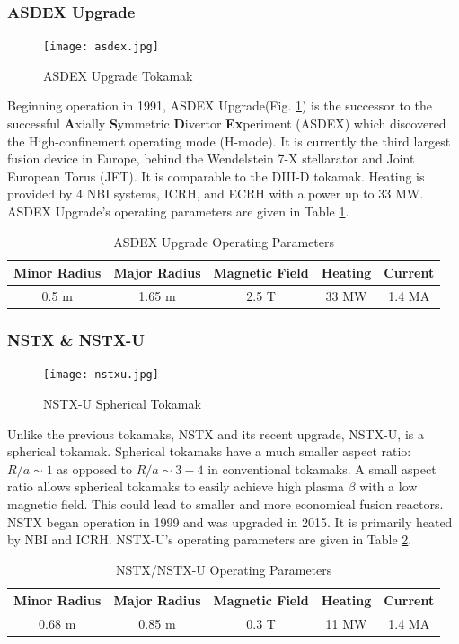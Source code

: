 \subsubsection{ASDEX Upgrade}
\begin{figure}[ht]
    \centering
    \texttt{[image: asdex.jpg]}
    \caption{ASDEX Upgrade Tokamak\cite{geiger2013thesis}}
    \label{fig:augd}
\end{figure}
Beginning operation in 1991, ASDEX Upgrade(Fig. \ref{fig:augd}) is the successor to the successful \textbf{A}xially \textbf{S}ymmetric \textbf{D}ivertor \textbf{Ex}periment (ASDEX) which discovered the High-confinement operating mode (H-mode)\cite{wagner1982hmode}. It is currently the third largest fusion device in Europe, behind the Wendelstein 7-X stellarator\cite{wendelstein7x1993} and Joint European Torus (JET)\cite{jet1985}. It is comparable to the DIII-D tokamak. Heating is provided by 4 NBI systems, ICRH, and ECRH with a power up to 33 MW. ASDEX Upgrade's operating parameters are given in Table \ref{tab:augd}. 
\begin{table}[]
    \centering
    \caption{ASDEX Upgrade Operating Parameters}
    \label{tab:augd}
    \begin{tabular}{ccccc}
        \textbf{Minor Radius} & \textbf{Major Radius} & \textbf{Magnetic Field} & \textbf{Heating} & \textbf{Current} \\ \hline \hline
        0.5 m & 1.65 m & 2.5 T & 33 MW & 1.4 MA \\ \hline
    \end{tabular}
\end{table}

\subsubsection{NSTX \& NSTX-U}
\begin{figure}[ht]
    \centering
    \texttt{[image: nstxu.jpg]}
    \caption{NSTX-U Spherical Tokamak}
    \label{fig:nstx}
\end{figure}
Unlike the previous tokamaks, NSTX and its recent upgrade, NSTX-U, is a spherical tokamak. Spherical tokamaks have a much smaller aspect ratio: $R/a\sim1$ as opposed to $R/a\sim3-4$ in conventional tokamaks. A small aspect ratio allows spherical tokamaks to easily achieve high plasma $\beta$ with a low magnetic field. This could lead to smaller and more economical fusion reactors. NSTX began operation in 1999 and was upgraded in 2015. It is primarily heated by NBI and ICRH. NSTX-U's operating parameters are given in Table \ref{tab:nstx}. 
\begin{table}[h!]
    \centering
    \caption{NSTX/NSTX-U Operating Parameters}
    \label{tab:nstx}
    \begin{tabular}{ccccc}
        \textbf{Minor Radius} & \textbf{Major Radius} & \textbf{Magnetic Field} & \textbf{Heating} & \textbf{Current} \\ \hline \hline
        0.68 m & 0.85 m & 0.3 T & 11 MW & 1.4 MA \\ \hline
    \end{tabular}
\end{table}

